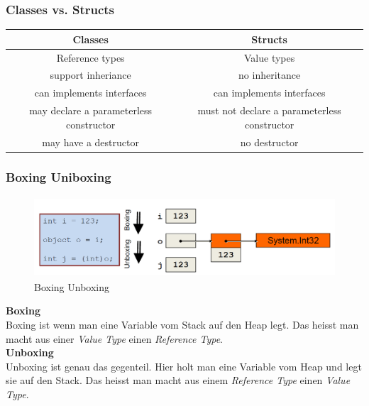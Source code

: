 \subsubsection{Classes vs. Structs}
\begin{tabular}{|c|c|}
	\hline
	           \textbf{Classes }            &               \textbf{Structs}               \\ \hline
	            Reference types             &                 Value types                  \\ \hline
	          support inheriance            &                no inheritance                \\ \hline
	       can implements interfaces        &          can implements interfaces           \\ \hline
	may declare a parameterless constructor & must not declare a parameterless constructor \\ \hline
	         may have a destructor          &                no destructor                 \\ \hline
\end{tabular} 

\subsubsection{Boxing Uniboxing}
\begin{figure}[h]
	\centering
	\includegraphics[height=3cm, ]{images/CSharp/BoxingUnboxing}
	\caption{Boxing Unboxing}	
\end{figure}

\textbf{Boxing}\\
Boxing ist wenn man eine Variable vom Stack auf den Heap legt. Das heisst man macht aus einer \textit{Value Type} einen \textit{Reference Type}.\\ 

\textbf{Unboxing}\\
Unboxing ist genau das gegenteil. Hier holt man eine Variable vom Heap und legt sie auf den Stack. Das heisst man macht aus einem \textit{Reference Type} einen \textit{Value Type}.